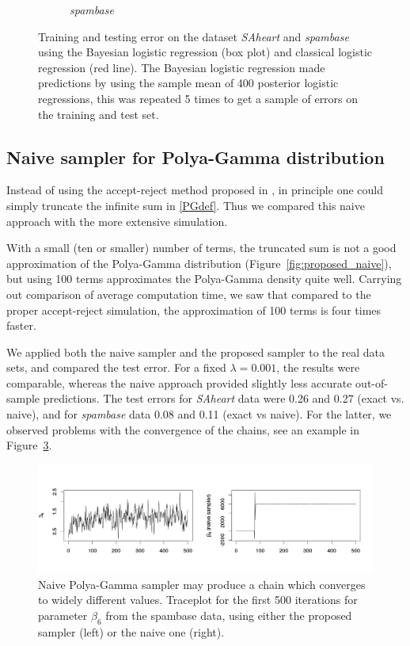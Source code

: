 \documentclass[a4paper]{article}\usepackage[]{graphicx}\usepackage[]{color}
\begin{document}
\begin{figure}
{\begin{subfigure}[b]{0.6\textwidth}
        \caption{\emph{spambase}}
        \label{fig:spambase}
    \end{subfigure}}
    \caption{Training and testing error on the dataset \emph{SAheart} and \emph{spambase} using the Bayesian logistic regression (box plot) and classical logistic regression (red line). The Bayesian logistic regression made predictions by using the sample mean of 400 posterior logistic regressions, this was repeated 5 times to get a sample of errors on the training and test set.}\label{fig:animals}
\end{figure}

\subsection{Naive sampler for Polya-Gamma distribution}

Instead of using the accept-reject method proposed in \cite{polson2013bayesian}, in principle one could simply truncate the infinite sum in \eqref{PGdef}. Thus we compared this naive approach with the more extensive simulation.

With a small (ten or smaller) number of terms, the truncated sum is not a good approximation of the Polya-Gamma distribution (Figure~\ref{fig:proposed_naive}), but using 100 terms approximates the Polya-Gamma density quite well.
Carrying out comparison of average computation time, we saw that compared to the proper accept-reject simulation, the approximation of 100 terms is four times faster.

We applied both the naive sampler and the proposed sampler to the real data sets, and compared the test error. For a fixed $\lambda=0.001$, the results were comparable, whereas the naive approach provided slightly less accurate out-of-sample predictions. The test errors for \emph{SAheart} data were 0.26 and 0.27 (exact vs. naive), and for \emph{spambase} data 0.08 and 0.11 (exact vs naive). For the latter, we observed problems with the convergence of the chains, see an example in Figure~\ref{fig:naive_convergence}.

\begin{figure}[!htbp]
\centering
\includegraphics[width=\textwidth]{naive_sampler}
\caption{Naive Polya-Gamma sampler may produce a chain which converges to widely different values. Traceplot for the first 500 iterations for parameter $\beta_6$ from the spambase data, using either the proposed sampler (left) or the naive one (right). }
\label{fig:naive_convergence}
\end{figure}
\end{document}
